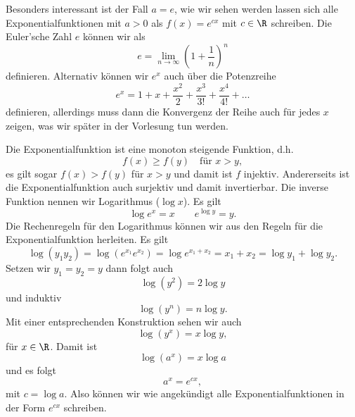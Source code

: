 \documentclass[letterpaper,10pt,english]{jupyterBook}
\begin{document}
Besonders interessant ist  der Fall \(a=e\), wie wir sehen werden lassen sich alle Exponentialfunktionen mit \(a > 0\) als \(f(x) = e^{cx}\) mit \(c\in \R\) schreiben. Die Euler’sche Zahl \(e\) können wir als
\begin{equation*}
 e= \lim_{n \rightarrow \infty} \left(1 + \frac{1}n\right)^n\end{equation*}
definieren. Alternativ können wir \(e^x\) auch über die Potenzreihe
\begin{equation*}
 e^{x} = 1 + x+ \frac{x^2}2 + \frac{x^3}{3!} + \frac{x^4}{4!} + \ldots\end{equation*}
definieren, allerdings muss dann die Konvergenz der Reihe auch für jedes \(x\) zeigen, was wir später in der Vorlesung tun werden.

Die Exponentialfunktion ist eine monoton steigende Funktion, d.h.
\begin{equation*}
 f(x) \geq f(y) \quad \text{für } x > y,\end{equation*}
es gilt sogar \(f(x) > f(y)\) für \(x > y\) und damit ist \(f\) injektiv. Andererseits ist die Exponentialfunktion auch surjektiv und damit invertierbar. Die inverse Funktion nennen wir Logarithmus (\(\log x\)). Es gilt
\begin{equation*}
 \log e^x = x \qquad e^{\log y} = y.\end{equation*}
Die Rechenregeln für den Logarithmus können wir aus den Regeln für die Exponentialfunktion herleiten. Es gilt
\begin{equation*}
 \log (y_1 y_2) = \log (e^{x_1} e^{x_2}) = \log e^{x_1 + x_2} = x_1 + x_2 = \log y_1 + \log y_2.\end{equation*}
Setzen wir \(y_1 = y_2 =y\) dann folgt auch
\begin{equation*}
  \log ( y^2) = 2 \log y\end{equation*}
und induktiv
\begin{equation*}
  \log ( y^n) = n \log y.\end{equation*}
Mit einer entsprechenden Konstruktion sehen wir auch
\begin{equation*}
 \log (y^x) = x \log y,\end{equation*}
für \(x \in \R\). Damit ist
\begin{equation*}
 \log (a^x) = x \log a\end{equation*}
und es folgt
\begin{equation*}
 a^x = e^{c x},\end{equation*}
mit \(c= \log a\). Also können wir wie angekündigt alle Exponentialfunktionen in der Form \(e^{cx}\) schreiben.
\end{document}

